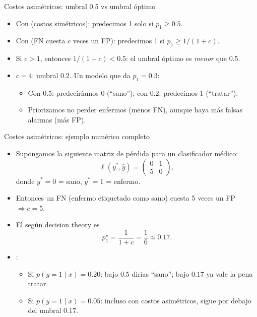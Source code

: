 \begin{frame}{Costos asimétricos: umbral 0.5 vs umbral óptimo}
\small
\begin{itemize}
  \item Con  (costos simétricos): predecimos 1 solo si \(p_1\ge 0.5\).
  \item Con  (FN cuesta \(c\) veces un FP): predecimos 1 si \(p_1\ge 1/(1+c)\).
  \item Si \(c>1\), entonces \(1/(1+c)<0.5\): el umbral óptimo es \emph{menor} que 0.5.
  \item {} \(c=4\): umbral \(0.2\). Un modelo que da \(p_1=0.3\):
  \begin{itemize}\small
    \item Con 0.5: predeciríamos 0 (``sano''); con 0.2: predecimos 1 (``tratar'').
    \item Priorizamos no perder enfermos (menos FN), aunque haya más falsas alarmas (más FP).
  \end{itemize}
\end{itemize}
\end{frame}

\begin{frame}{Costos asimétricos: ejemplo numérico completo}
\small
\begin{itemize}
  \item Supongamos la siguiente matriz de pérdida para un clasificador médico:
  \[
  \ell(y^*,\hat{y}) =
  \begin{pmatrix}
    0 & 1 \\
    5 & 0
  \end{pmatrix},
  \]
  donde \(y^*=0\) = sano, \(y^*=1\) = enfermo.
  \item Entonces un FN (enfermo etiquetado como sano) cuesta 5 veces un FP \(\Rightarrow c=5\).
  \item El  según decision theory es
  \[
    p_1^\star = \frac{1}{1+c} = \frac{1}{6}\approx 0.17.
  \]
  \item {}:
  \begin{itemize}
    \item Si \(p(y=1\mid x)=0.20\): bajo \(0.5\) dirías “sano”; bajo \(0.17\) ya vale la pena tratar.
    \item Si \(p(y=1\mid x)=0.05\): incluso con costos asimétricos, sigue por debajo del umbral \(0.17\).
  \end{itemize}
\end{itemize}
\end{frame}

